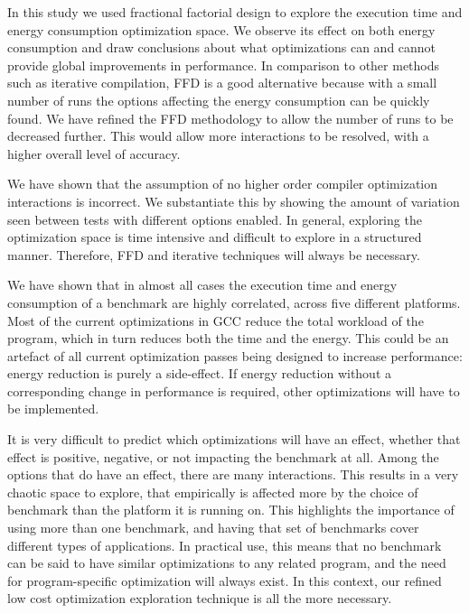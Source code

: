 \documentclass[twocolumn]{article}
\newcommand{\todo}[1]{\textbf{\textcolor{red}{#1}}}
\begin{document}

In this study we used fractional factorial design to explore the  execution time and energy consumption optimization space. We observe its effect on both energy consumption and draw conclusions about what optimizations can and cannot provide global improvements in performance. In comparison to other methods such as iterative compilation, FFD is a good alternative because with a small number of runs the options affecting the energy consumption can be quickly found. We have refined the FFD methodology to allow the number of runs to be decreased further. This would allow more interactions to be resolved, with a higher overall level of accuracy.

We have shown that the assumption of no higher order compiler optimization interactions is incorrect. We substantiate this by showing the amount of variation seen between tests with different options enabled. In general, exploring the optimization space is time intensive and difficult to explore in a structured manner. Therefore, FFD and iterative techniques will always be necessary.

We have shown that in almost all cases the execution time and energy consumption of a benchmark are highly correlated, across five different platforms. Most of the current optimizations in GCC reduce the total workload of the program, which in turn reduces both the time and the energy. This could be an artefact of all current optimization passes being designed to increase performance: energy reduction is purely a side-effect. If energy reduction without a corresponding change in performance is required, other optimizations will have to be implemented.

It is very difficult to predict which optimizations will have an effect, whether that effect is positive, negative, or not impacting the benchmark at all. Among the options that do have an effect, there are many interactions. This results in a very chaotic space to explore, that empirically is affected more by the choice of benchmark than the platform it is running on. This highlights the importance of using more than one benchmark, and having that set of benchmarks cover different types of applications. In practical use, this means that no benchmark can be said to have similar optimizations to any related program, and the need for program-specific optimization will always exist. In this context, our refined low cost optimization exploration technique is all the more necessary.
\end{document}
